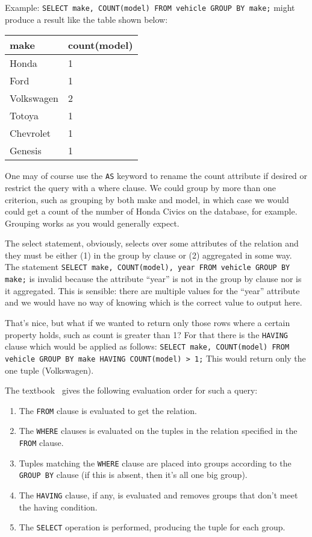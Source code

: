 \documentclass[a4paper]{report}
\begin{document}
Example: \texttt{SELECT make, COUNT(model) FROM vehicle GROUP BY make;} might produce a result like the table shown below:

\begin{center}
\begin{tabular}{|l|l|}\hline
	\textbf{make} & \textbf{count(model)} \\ \hline
	Honda & 1  \\ \hline
	Ford & 1  \\ \hline
	Volkswagen & 2  \\ \hline
	Totoya & 1  \\ \hline
	Chevrolet & 1  \\ \hline
	Genesis & 1  \\ \hline
\end{tabular}
\end{center}

One may of course use the \texttt{AS} keyword to rename the count attribute if desired or restrict the query with a where clause. We could group by more than one criterion, such as grouping by both make and model, in which case we would could get a count of the number of Honda Civics on the database, for example. Grouping works as you would generally expect. 

The select statement, obviously, selects over some attributes of the relation and they must be either (1) in the group by clause or (2) aggregated in some way. The statement \texttt{SELECT make, COUNT(model), year FROM vehicle GROUP BY make;} is invalid because the attribute ``year'' is not in the group by clause nor is it aggregated. This is sensible: there are multiple values for the ``year'' attribute and we would have no way of knowing which is the correct value to output here.


That's nice, but what if we wanted to return only those rows where a certain property holds, such as count is greater than 1? For that there is the \texttt{HAVING} clause which would be applied as follows: \texttt{SELECT make, COUNT(model) FROM vehicle GROUP BY make HAVING COUNT(model) > 1;} This would return only the one tuple (Volkswagen).

The textbook~\cite{dsc} gives the following evaluation order for such a query:

\begin{enumerate}
	\item The \texttt{FROM} clause is evaluated to get the relation.
	\item The \texttt{WHERE} clauses is evaluated on the tuples in the relation specified in the \texttt{FROM} clause.
	\item Tuples matching the \texttt{WHERE} clause are placed into groups according to the \texttt{GROUP BY} clause (if this is absent, then it's all one big group).
	\item The \texttt{HAVING} clause, if any, is evaluated and removes groups that don't meet the having condition.
	\item The \texttt{SELECT} operation is performed, producing the tuple for each group.
\end{enumerate}
\end{document}
